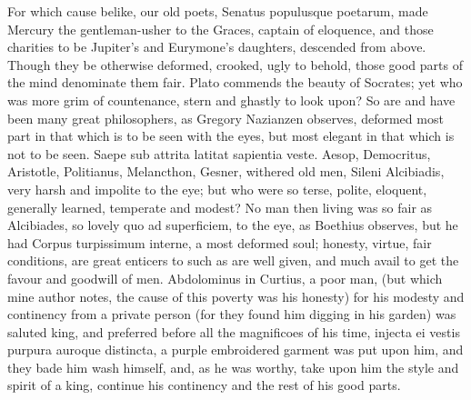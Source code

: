 {For which cause belike, our old poets, Senatus populusque poetarum,
made Mercury the gentleman-usher to the Graces, captain of eloquence,
and those charities to be Jupiter's and Eurymone's daughters, descended
from above. Though they be otherwise deformed, crooked, ugly to behold,
those good parts of the mind denominate them fair. Plato commends the
beauty of Socrates; yet who was more grim of countenance, stern and
ghastly to look upon? So are and have been many great philosophers, as
Gregory Nazianzen observes, deformed most part in that which is
to be seen with the eyes, but most elegant in that which is not to be
seen. Saepe sub attrita latitat sapientia veste. Aesop, Democritus,
Aristotle, Politianus, Melancthon, Gesner, \etc{} withered old men, Sileni
Alcibiadis, very harsh and impolite to the eye; but who were so terse,
polite, eloquent, generally learned, temperate and modest? No man then
living was so fair as Alcibiades, so lovely quo ad superficiem, to the
eye, as Boethius observes, but he had Corpus turpissimum interne,
a most deformed soul; honesty, virtue, fair conditions, are great
enticers to such as are well given, and much avail to get the favour
and goodwill of men. Abdolominus in Curtius, a poor man, (but which
mine author notes, the cause of this poverty was his honesty) for
his modesty and continency from a private person (for they found him
digging in his garden) was saluted king, and preferred before all the
magnificoes of his time, injecta ei vestis purpura auroque distincta, a
purple embroidered garment was put upon him, and they bade him
wash himself, and, as he was worthy, take upon him the style and spirit
of a king, continue his continency and the rest of his good parts.

}
